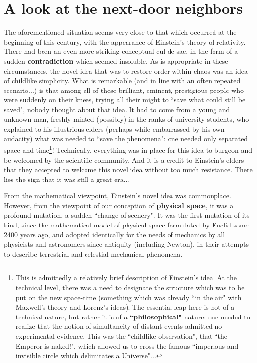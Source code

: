 \section{A look at the next-door neighbors}

The aforementioned situation seems very close to that which occurred at the beginning of this century, with the appearance of Einstein's theory of relativity. There had been an even more striking conceptual cul-de-sac, in the form of a sudden \textbf{contradiction} which seemed insoluble. As is appropriate in these circumstances, the novel idea that was to restore order within chaos was an idea of childlike simplicity. What is remarkable (and in line with an often repeated scenario...) is that among all of these brilliant, eminent, prestigious people who were suddenly on their knees, trying all their might to ``save what could still be saved", nobody thought about that idea. It had to come from a young and unknown man, freshly minted (possibly) in the ranks of university students, who explained to his illustrious elders (perhaps while embarrassed by his own audacity) what was needed to ``save the phenomena": one needed only separated space and time\footnote{This is admittedly a relatively brief description of Einstein's idea. At the technical level, there was a need to designate the structure which was to be put on the new space-time (something which was already ``in the air" with Maxwell's theory and Lorenz's ideas). The essential leap here is not of a technical nature, but rather it is of a \textbf{``philosophical"} nature: one needed to realize that the notion of simultaneity of distant events admitted no experimental evidence.  This was the ``childlike observation", that ``the Emperor is naked!", which allowed us to cross the famous ``imperious and invisible circle which delimitates a Universe"...}! Technically, everything was in place for this idea to burgeon and be welcomed by the scientific community. And it is a credit to Einstein's elders that they accepted to welcome this novel idea without too much resistance. There lies the sign that it was still a great era...

From the mathematical viewpoint, Einstein's novel idea was commonplace. However, from the viewpoint of our conception of \textbf{physical space}, it was a profound mutation, a sudden ``change of scenery". It was the first mutation of its kind, since the mathematical model of physical space formulated by Euclid some 2400 years ago, and adopted identically for the needs of mechanics by all physicists and astronomers since antiquity (including Newton), in their attempts to describe terrestrial and celestial mechanical phenomena.

